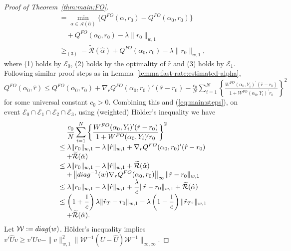 \documentclass[11pt]{article}
\begin{document}
\begin{proof}[Proof of Theorem~\ref{thm:main:FO}]
\begin{equation}
\begin{array}{rl}
&\displaystyle  = \min_{\alpha \in \mathcal{A}(\hat\alpha)} \{Q^{FO}(\alpha,r_0)-Q^{FO}(\alpha_0,r_0)\}\\
&\quad\displaystyle + Q^{FO}(\alpha_0,r_0)- \lambda \|r_0\|_{w,1} \\
&\displaystyle  \geq_{(3)} - \widetilde{\mathcal{R}}(\hat\alpha) + Q^{FO}(\alpha_0,r_0)- \lambda \|r_0\|_{w,1},
\end{array}
\end{equation}
where (1) holds by $\mathcal{E}_0$, (2) holds by the optimality of $\hat r$ and (3) holds by $\mathcal{E}_1$. Following similar proof steps as in Lemma~\ref{lemma:fast-rate:estimated-alpha}, $Q^{FO}(\alpha_0,\hat r)\leq Q^{FO}(\alpha_0, r_0) + \nabla_r Q^{FO}(\alpha_0, r_0)'(\hat r - r_0)  - \frac{c_0}{N} \sum_{i=1}^N\left\{\frac{W^{FO}(\alpha_0,Y_i)^\prime(\hat{r}-r_0)}{1+W^{FO}(\alpha_0,Y_i)^\prime r_0}\right\}^2$ for some universal constant $c_0>0$. Combining this and (\ref{eq:main:steps}), on event $\mathcal{E}_0\cap\mathcal{E}_1\cap\mathcal{E}_2\cap\mathcal{E}_3$, using (weighted) H\"older's inequality we have 
\begin{equation}\label{eq:thm1:main:main}\begin{array}{rl}
&\displaystyle\quad\frac{c_0}{N} \sum_{i=1}^N\left\{\frac{W^{FO}(\alpha_0,Y_i)^\prime(\hat{r}-r_0)}{1+W^{FO}(\alpha_0,Y_i)^\prime r_0}\right\}^2\\
&\displaystyle \leq   \lambda\|r_0\|_{w,1} -  \lambda\|\hat r\|_{w,1}   + \nabla_r Q^{FO}(\alpha_0,r_0)'(\hat r - r_0)\\
&\quad\displaystyle + \widetilde{\mathcal{R}}(\hat\alpha)\\ 
&\displaystyle \leq \lambda\|r_0\|_{w,1} -  \lambda\|\hat r\|_{w,1}+ \widetilde{\mathcal{R}}(\hat\alpha)\\
&\displaystyle\quad + \left\|{\rm diag}^{-1}(w) \nabla_r Q^{FO}(\alpha_0,r_0)\right\|_\infty\|\hat r - r_0\|_{w,1} \\
&\displaystyle \leq    \lambda\|r_0\|_{w,1} -  \lambda\|\hat r\|_{w,1} + \frac{\lambda}{c}\|\hat r - r_0\|_{w,1}   + \widetilde{\mathcal{R}}(\hat\alpha)\\
&\displaystyle \leq \left(1+\frac{1}{c}\right)\lambda \|\hat r_T-r_0\|_{w,1} -  \lambda \left(1-\frac{1}{c}\right)\|\hat r_{T^c}\|_{w,1}\\
&\displaystyle\quad + \widetilde{\mathcal{R}}(\hat\alpha).
\end{array}
\end{equation}
Let $\mathcal{W}:={\rm diag}(w)$. H\"older's inequality implies $v'\hat Uv \geq v'Uv - \|v\|_{w,1}^2\|\mathcal{W}^{-1}(U-\hat U)\mathcal{W}^{-1}\|_{\infty,\infty}$.

\end{proof}
\end{document}
